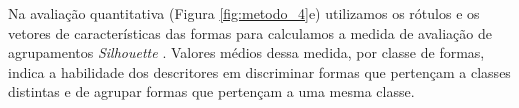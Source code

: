 Na avaliação quantitativa (Figura \ref{fig:metodo_4}e) utilizamos os rótulos e os vetores de características das formas para calculamos a medida de avaliação de agrupamentos \emph{Silhouette} \cite{Rousseeuw:1987}. Valores médios dessa medida, por classe de formas, indica a habilidade dos descritores em discriminar formas que pertençam a classes distintas e de agrupar formas que pertençam a uma mesma classe.
\begin{comment}

\section{Fusão de características}

Conforme ilustra a Figura \ref{fig:features1} construímos três bases de dados de vetores de características multiescala a partir das formas da base da Figura \ref{fig:db1}. A aplicação da técnica PCA às características multiescala possibilita obter como saída vetores de componentes descorrelacionadas e de máxima variância (citar). 

\begin{figure}[h!]
  \caption{\label{fig:features1} Metodologia que emprega a técnicas \emph{PCA} para obtenção de um descritor híbrido através da fusão de descritores multiescala.}
  \centering
  \texttt{[image: features1.eps]}
\end{figure}

\begin{figure}[h!]
  \caption{\label{fig:acuracia} Acurácia média por classe aferida nos experimentos de recuperação de formas pelo conteúdo, com a base Kimia-99, para os descritores (a) Dimensão fractal multiescala; (b) Energia de dobramento multiescala.}
  \centering
  \texttt{[image: resultado\_acuracia.eps]}
\end{figure}

\end{comment}

\color{black}
\begin{comment}
\section{Bases de imagens}
\end{comment}
\begin{comment}
\begin{figure}
\centering
\caption{\label{Met:1}Metodologia 1}
\texttt{[image: Metodologia1.eps]}
\end{figure}

\begin{figure}
\centering
\caption{\label{Met:2}Metodologia 2}
\texttt{[image: figura\_metodo.eps]}
\end{figure}
\end{comment}